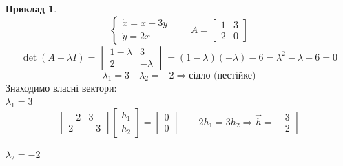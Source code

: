 \documentclass[14pt,a4paper]{scrartcl}
\theoremstyle{definition}
\newtheorem*{example}{Приклад}
\theoremstyle{definition}
\theoremstyle{definition}
\begin{document}
\begin{example}
    $$
    \begin{cases}
        \dot{x} = x + 3y\\
        \dot{y} = 2x
    \end{cases} \qquad A = \begin{bmatrix}
     1 & 3 \\
     2 & 0
    \end{bmatrix}
    $$
    $$
    \det (A - \lambda I) = \begin{vmatrix}
      1-\lambda & 3 \\
      2 & - \lambda
    \end{vmatrix} = (1- \lambda)(-\lambda) - 6 = \lambda^2 - \lambda - 6 = 0
    $$
    $$
    \lambda_1 = 3 \quad \lambda_2 = -2 \Longrightarrow \text{сідло (нестійке)}
    $$
    Знаходимо власні вектори: \\
    $\lambda_1 = 3$
    $$
    \begin{bmatrix}
     -2 & 3\\
     2 & -3
    \end{bmatrix} \begin{bmatrix}
     h_1\\
     h_2
    \end{bmatrix} = \begin{bmatrix}
      0\\
      0
    \end{bmatrix} \qquad 2h_1 = 3 h_2 \Rightarrow \overrightarrow{h} = \begin{bmatrix}
     3 \\
     2
    \end{bmatrix}
    $$

    $\lambda_2 = -2$


\end{example}
\end{document}
